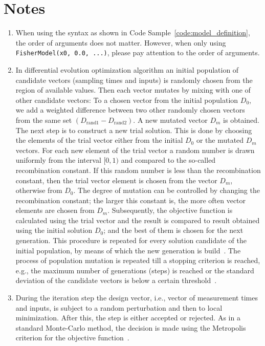 \documentclass[graybox]{svmult}
\begin{document}
\section{Notes}
\begin{enumerate}
    \item \label{note-order-arguments-python} When using the syntax as shown in Code Sample~\ref{code:model_definition}, the order of arguments does not matter. However, when only using \texttt{FisherModel(x0, 0.0, ...)}, please pay attention to the order of arguments.
    \item \label{note-differential-evolution-details} In differential evolution optimization algorithm an initial population of candidate vectors (sampling times and inputs) is randomly chosen from the region of available values. Then each vector mutates by mixing with one of other candidate vectors: To a chosen vector from the initial population $D_0$, we add a weighted difference between two other randomly chosen vectors from the same set $(D_\text{rand1} - D_\text{rand2})$. A new mutated vector $D_m$ is obtained. The next step is to construct a new trial solution. This is done by choosing the elements of the trial vector either from the initial $D_0$ or the mutated $D_m$ vectors. For each new element of the trial vector a random number is drawn uniformly from the interval $[0, 1)$ and compared to the so-called recombination constant. If this random number is less than the recombination constant, then the trial vector element is chosen from the vector $D_m$, otherwise from $D_0$. The degree of mutation can be controlled by changing the recombination constant; the larger this constant is, the more often vector elements are chosen from $D_m$. Subsequently, the objective function is calculated using the trial vector and the result is compared to result obtained using the initial solution $D_0$; and the best of them is chosen for the next generation. This procedure is repeated for every solution candidate of the initial population, by means of which the new generation is build~\cite{scipydiffev}. The process of population mutation is repeated till a stopping criterion is reached, e.g., the maximum number of generations (steps) is reached or the standard deviation of the candidate vectors is below a certain threshold~\cite{Zielinski_DE}.
    \item \label{note-basin-hopping-details} During the iteration step the design vector, i.e., vector of measurement times and inputs, is subject to a random perturbation and then to local minimization. After this, the step is either accepted or rejected. As in a standard Monte-Carlo method, the decision is made using the Metropolis criterion for the objective function~\cite{scipybashop}.

\end{enumerate}
\end{document}
